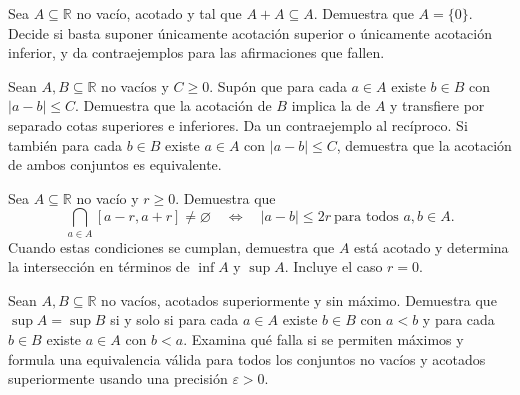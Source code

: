 \begin{samepage}
\begin{problem}\label{prob:reto-acotacion-08}
Sea $A\subseteq\mathbb R$ no vacío, acotado y tal que $A+A\subseteq A$. Demuestra que $A=\{0\}$. Decide si basta suponer únicamente acotación superior o únicamente acotación inferior, y da contraejemplos para las afirmaciones que fallen.
\end{problem}
\end{samepage}
\par{}

\begin{samepage}
\begin{problem}\label{prob:reto-acotacion-09}
Sean $A,B\subseteq\mathbb R$ no vacíos y $C\ge0$. Supón que para cada $a\in A$ existe $b\in B$ con $|a-b|\le C$. Demuestra que la acotación de $B$ implica la de $A$ y transfiere por separado cotas superiores e inferiores. Da un contraejemplo al recíproco. Si también para cada $b\in B$ existe $a\in A$ con $|a-b|\le C$, demuestra que la acotación de ambos conjuntos es equivalente.
\end{problem}
\end{samepage}
\par{}

\begin{samepage}
\begin{problem}\label{prob:reto-acotacion-10}
Sea $A\subseteq\mathbb R$ no vacío y $r\ge0$. Demuestra que
\[
\bigcap_{a\in A}[a-r,a+r]\ne\varnothing
\quad\Longleftrightarrow\quad
|a-b|\le2r\ \text{para todos }a,b\in A.
\]
Cuando estas condiciones se cumplan, demuestra que $A$ está acotado y determina la intersección en términos de $\inf A$ y $\sup A$. Incluye el caso $r=0$.
\end{problem}
\end{samepage}
\par{}

\begin{samepage}
\begin{problem}\label{prob:reto-extremos-01}
Sean $A,B\subseteq\mathbb R$ no vacíos, acotados superiormente y sin máximo. Demuestra que $\sup A=\sup B$ si y solo si para cada $a\in A$ existe $b\in B$ con $a<b$ y para cada $b\in B$ existe $a\in A$ con $b<a$. Examina qué falla si se permiten máximos y formula una equivalencia válida para todos los conjuntos no vacíos y acotados superiormente usando una precisión $\varepsilon>0$.~\cite{mseSupCoinciden}
\end{problem}
\end{samepage}
\par{}

